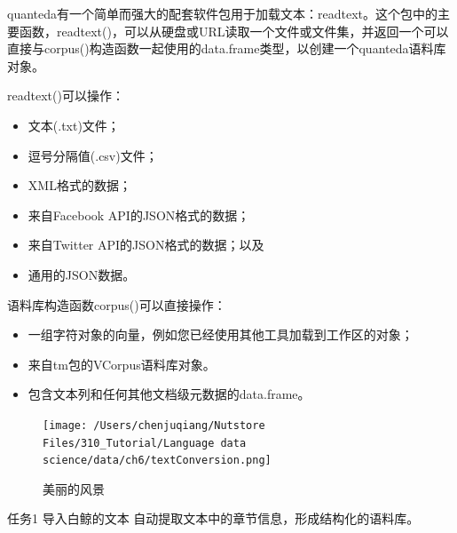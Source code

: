 \documentclass[]{book}
\providecommand{\tightlist}{%
  \setlength{\itemsep}{0pt}\setlength{\parskip}{0pt}}
\begin{document}
quanteda有一个简单而强大的配套软件包用于加载文本：readtext。这个包中的主要函数，readtext()，可以从硬盘或URL读取一个文件或文件集，并返回一个可以直接与corpus()构造函数一起使用的data.frame类型，以创建一个quanteda语料库对象。

readtext()可以操作：

\begin{itemize}
\tightlist
\item
  文本(.txt)文件；
\item
  逗号分隔值(.csv)文件；
\item
  XML格式的数据；
\item
  来自Facebook API的JSON格式的数据；
\item
  来自Twitter API的JSON格式的数据；以及
\item
  通用的JSON数据。
\end{itemize}

语料库构造函数corpus()可以直接操作：

\begin{itemize}
\tightlist
\item
  一组字符对象的向量，例如您已经使用其他工具加载到工作区的对象；
\item
  来自tm包的VCorpus语料库对象。
\item
  包含文本列和任何其他文档级元数据的data.frame。
\end{itemize}

\begin{figure}
\centering
\texttt{[image: /Users/chenjuqiang/Nutstore Files/310\_Tutorial/Language data science/data/ch6/textConversion.png]}
\caption{美丽的风景}
\end{figure}

任务1
导入白鲸的文本
自动提取文本中的章节信息，形成结构化的语料库。
\end{document}
